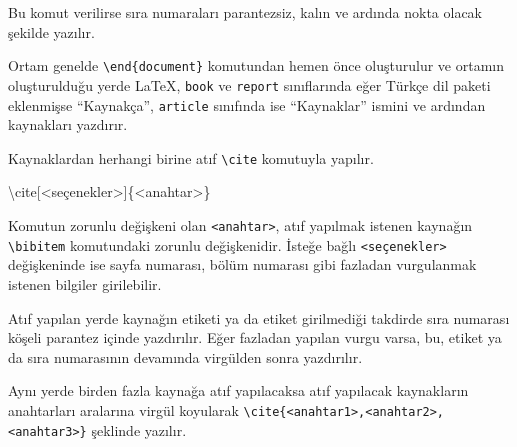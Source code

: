 \documentclass[
  letterpaper,
  DIV=11,
  numbers=noendperiod]{scrreprt}
\newenvironment{Shaded}{\begin{snugshade}}{\end{snugshade}}
\newcommand{\ExtensionTok}[1]{\textcolor[rgb]{0.00,0.23,0.31}{#1}}
\newcommand{\KeywordTok}[1]{\textcolor[rgb]{0.00,0.23,0.31}{#1}}
\newcommand{\NormalTok}[1]{\textcolor[rgb]{0.00,0.23,0.31}{#1}}
\begin{document}
Bu komut verilirse sıra numaraları parantezsiz, kalın ve ardında nokta
olacak şekilde yazılır.

Ortam genelde \texttt{\textbackslash{}end\{document\}} komutundan hemen
önce oluşturulur ve ortamın oluşturulduğu yerde {\LaTeX}, \texttt{book}
ve \texttt{report} sınıflarında eğer Türkçe dil paketi eklenmişse
``Kaynakça'', \texttt{article} sınıfında ise ``Kaynaklar'' ismini ve
ardından kaynakları yazdırır.

Kaynaklardan herhangi birine atıf \texttt{\textbackslash{}cite}
komutuyla yapılır.

\begin{Shaded}
\begin{Highlighting}[]
\KeywordTok{\textbackslash{}cite}\NormalTok{[\textless{}seçenekler\textgreater{}]\{}\ExtensionTok{\textless{}anahtar\textgreater{}}\NormalTok{\}}
\end{Highlighting}
\end{Shaded}

Komutun zorunlu değişkeni olan
\texttt{\textless{}anahtar\textgreater{}}, atıf yapılmak istenen
kaynağın \texttt{\textbackslash{}bibitem} komutundaki zorunlu
değişkenidir. İsteğe bağlı \texttt{\textless{}seçenekler\textgreater{}}
değişkeninde ise sayfa numarası, bölüm numarası gibi fazladan
vurgulanmak istenen bilgiler girilebilir.

Atıf yapılan yerde kaynağın etiketi ya da etiket girilmediği takdirde
sıra numarası köşeli parantez içinde yazdırılır. Eğer fazladan yapılan
vurgu varsa, bu, etiket ya da sıra numarasının devamında virgülden sonra
yazdırılır.

Aynı yerde birden fazla kaynağa atıf yapılacaksa atıf yapılacak
kaynakların anahtarları aralarına virgül koyularak
\texttt{\textbackslash{}cite\{\textless{}anahtar1\textgreater{},\textless{}anahtar2\textgreater{},\textless{}anahtar3\textgreater{}\}}
şeklinde yazılır.
\end{document}
